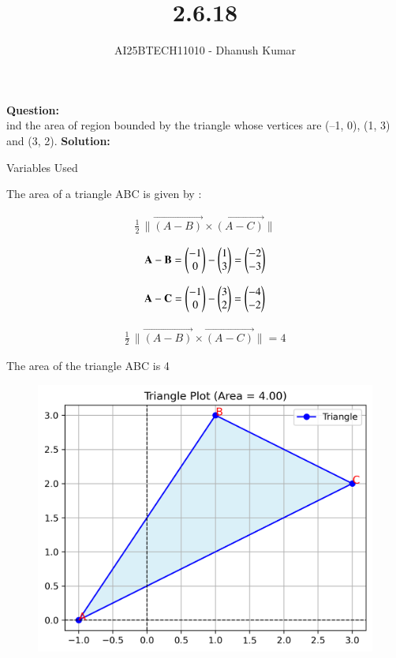 \documentclass[journal]{IEEEtran}
\begin{document}
\title{2.6.18}
\author{AI25BTECH11010 - Dhanush Kumar}
\maketitle
\renewcommand{\thefigure}{\theenumi}
\renewcommand{\thetable}{\theenumi}

\noindent
\textbf{Question:} \\
ind the area of region bounded by the triangle whose vertices are (–1, 0), (1, 3) and
(3, 2).
\bigskip
\noindent
\textbf{Solution:}\\
 \begin{table}[H]    
      \centering
      
      \caption{Variables Used}
      \label{}
    \end{table}

The area of a triangle ABC is given by :

\begin{align*}
\frac{1}{2}\,\lVert \vec{(A-B)}\times\vec{(A-C)}\rVert
\end{align*}


\begin{align}
   \mathbf{A}-\mathbf{B} = \begin{pmatrix}-1 \\ 0\end{pmatrix} - \begin{pmatrix}1 \\ 3\end{pmatrix} = \begin{pmatrix}-2 \\ -3\end{pmatrix}
\end{align}

\begin{align}
   \mathbf{A}-\mathbf{C} = \begin{pmatrix}-1 \\ 0\end{pmatrix} - \begin{pmatrix}3 \\ 2\end{pmatrix} = \begin{pmatrix}-4 \\ -2\end{pmatrix}
\end{align}


\begin{align}
\frac{1}{2}\,\lVert \vec{(A-B)}\times\vec{(A-C)}\rVert = 4
\end{align}

\bigskip
The area of the triangle ABC is 4


\begin{figure}[h!]
  \centering
   \includegraphics[width=0.7\linewidth]{../figs/triangle_plot.png}
   \caption{}
  \label{stemplot}
\end{figure}
\end{document}
